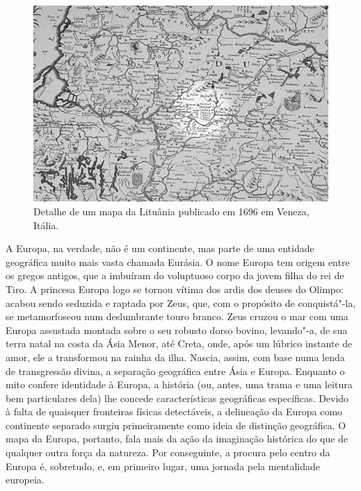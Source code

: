 
\begin{figure}[!h]
    \centering
    \includegraphics[width=\textwidth]{ilustra-03.png}
    \caption{Detalhe de um mapa da Lituânia publicado em 1696 em Veneza, Itália.}
\end{figure}

A Europa, na verdade, não é um continente, mas parte de uma entidade
geográfica muito mais vasta chamada Eurásia. O nome Europa tem origem
entre os gregos antigos, que a imbuíram do voluptuoso corpo da jovem
filha do rei de Tiro. A princesa Europa logo se tornou vítima dos ardis
dos deuses do Olimpo: acabou sendo seduzida e raptada por Zeus, que, com
o propósito de conquistá"-la, se metamorfoseou num deslumbrante touro
branco. Zeus cruzou o mar com uma Europa assustada montada sobre o seu
robusto dorso bovino, levando"-a, de sua terra natal na costa da Ásia
Menor, até Creta, onde, após um lúbrico instante de amor, ele a
transformou na rainha da ilha. Nascia, assim, com base numa lenda de
transgressão divina, a separação geográfica entre Ásia e Europa.
Enquanto o mito confere identidade à Europa, a história (ou, antes, uma
trama e uma leitura bem particulares dela) lhe concede características
geográficas específicas. Devido à falta de quaisquer fronteiras físicas
detectáveis, a delineação da Europa como continente separado surgiu
primeiramente como ideia de distinção geográfica. O mapa da Europa,
portanto, fala mais da ação da imaginação histórica do que de qualquer
outra força da natureza. Por conseguinte, a procura pelo centro da
Europa é, sobretudo, e, em primeiro lugar, uma jornada pela mentalidade
europeia.

